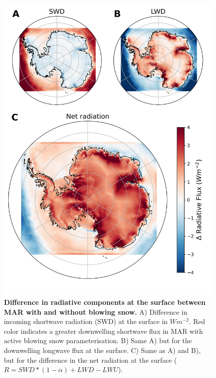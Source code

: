 \documentclass[12pt]{article}
\begin{document}
\begin{figure}[H]
	\includegraphics[scale=0.7,center]{SEB.png}
	\caption{\textbf{Difference in radiative components at the surface between MAR with and without blowing snow.} A) Difference in incoming shortwave radiation (SWD) at the surface in $Wm^{-2}$. Red color indicates a greater downwelling shortwave flux in MAR with active blowing snow parameterisation. B) Same A) but for the downwelling longwave flux at the surface. C) Same as A) and B), but for the difference in the net radiation at the surface ($R= SWD * (1 - \alpha) + LWD - LWU$).}
	\label{fig:SEB}
\end{figure}
\end{document}
